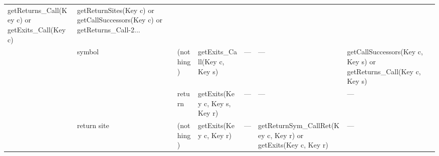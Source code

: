 \begin{sidewaystable}
\begin{tabular}{x{0.6in}x{0.6in}x{0.6in}|x{1.9in}x{1.9in}x{1.9in}x{2in}}
                                                                                                                                        getReturns\_Call(Key c) or \newline
                                                                                                                                        getExits\_Call(Key c)                  &  getReturnSites(Key c) or \newline
                                                                                                                                                                                     getCallSuccessors(Key c) or \newline
                                                                                                                                                                                     getReturns\_Call-2...                    \tabularnewline
                &  symbol           &  (nothing)    & getExits\_Call(Key c, Key s)    &   ---                                   &        ---                                 &  getCallSuccessors(Key c, Key s) \newline
                                                                                                                                                                                     or getReturns\_Call(Key c, Key s)   \tabularnewline
                &                   &  return       & getExits(Key c, Key s, Key r) &   ---                                   &        ---                                 &    ---                                    \tabularnewline
                &  return site      &  (nothing)    & getExits(Key c, Key r)          &   ---                                   &  getReturnSym\_CallRet(Key c, Key r) \newline
                                                                                                                                        or getExits(Key c, Key r)            &   ---                                     \tabularnewline
\midrule %

\end{tabular}
\end{sidewaystable}
